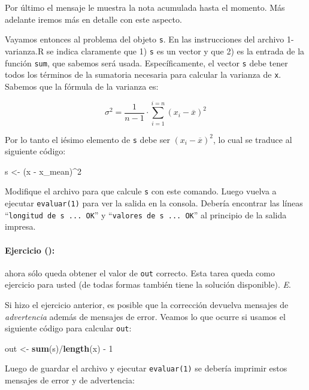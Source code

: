 \documentclass[]{article}
\newenvironment{Shaded}{}{}
\newcommand{\KeywordTok}[1]{\textcolor[rgb]{0.00,0.44,0.13}{\textbf{{#1}}}}
\newcommand{\DecValTok}[1]{\textcolor[rgb]{0.25,0.63,0.44}{{#1}}}
\newcommand{\NormalTok}[1]{{#1}}
\begin{document}
Por último el mensaje le muestra la nota acumulada hasta el momento. Más
adelante iremos más en detalle con este aspecto.

Vayamos entonces al problema del objeto \texttt{s}. En las instrucciones
del archivo 1-varianza.R se indica claramente que 1) \texttt{s} es un
vector y que 2) es la entrada de la función \texttt{sum}, que sabemos
será usada. Específicamente, el vector \texttt{s} debe tener todos los
términos de la sumatoria necesaria para calcular la varianza de
\texttt{x}. Sabemos que la fórmula de la varianza es:

\[
\sigma ^ 2 = \frac{1}{n - 1} \cdot \sum_{i=1}^{i=n} (x_i - \overline{x}) ^ 2 
\]

Por lo tanto el iésimo elemento de \texttt{s} debe ser
$(x_i - \overline{x}) ^ 2$, lo cual se traduce al siguiente código:

\begin{Shaded}
\begin{Highlighting}[]
\NormalTok{s <- (x - x_mean)^}\DecValTok{2}
\end{Highlighting}
\end{Shaded}
Modifique el archivo para que calcule \texttt{s} con este comando. Luego
vuelva a ejecutar \texttt{evaluar(1)} para ver la salida en la consola.
Debería encontrar las líneas ``\texttt{longitud de s ... OK}'' y
``\texttt{valores de s ... OK}'' al principio de la salida impresa.

\paragraph{Ejercicio ():}

ahora sólo queda obtener el valor de \texttt{out} correcto. Esta tarea
queda como ejercicio para usted (de todas formas también tiene la
solución disponible). \emph{E}.

Si hizo el ejercicio anterior, es posible que la corrección devuelva
mensajes de \emph{advertencia} además de mensajes de error. Veamos lo
que ocurre si usamos el siguiente código para calcular \texttt{out}:

\begin{Shaded}
\begin{Highlighting}[]
\NormalTok{out <- }\KeywordTok{sum}\NormalTok{(s)/}\KeywordTok{length}\NormalTok{(x) - }\DecValTok{1}
\end{Highlighting}
\end{Shaded}
Luego de guardar el archivo y ejecutar \texttt{evaluar(1)} se debería
imprimir estos mensajes de error y de advertencia:
\end{document}
